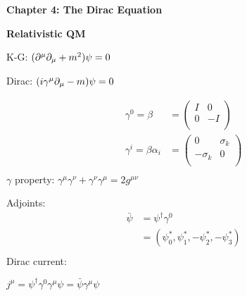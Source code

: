\textbf{Chapter 4: The Dirac Equation}

\textbf{Relativistic QM}

\begin{multicols}{2}
    K-G: $(\partial^\mu\partial_\mu + m^2)\psi = 0$

    Dirac: $(i\gamma^\mu \partial_\mu - m)\psi = 0$

    \begin{align*}
        \gamma^0 = \beta &= \begin{pmatrix}
            I & 0 \\
            0 & -I \\
        \end{pmatrix} \\
        \gamma^i = \beta\alpha_i &= \begin{pmatrix}
            0 & \sigma_k \\
            -\sigma_k & 0 \\
        \end{pmatrix} \\
    \end{align*}
    $\gamma$ property: $\gamma^\mu\gamma^\nu + \gamma^\nu\gamma^\mu = 2g^{\mu\nu}$


    Adjoints:
    \begin{align*}
        \bar{\psi} &= \psi^\dagger \gamma^0 \\
        &= (\psi_0^*, \psi_1^*, -\psi_2^*, -\psi_3^*) \\
    \end{align*}
    Dirac current:

    $j^\mu = \psi^\dagger\gamma^0\gamma^\mu\psi = \bar{\psi}\gamma^\mu\psi$

\end{multicols}
